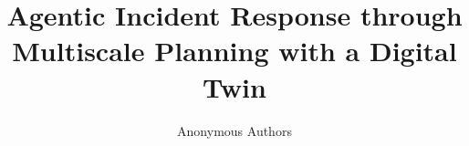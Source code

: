 \documentclass[sigconf]{acmart}
\begin{document}
\title{Agentic Incident Response through \\Multiscale Planning with a Digital Twin}


\author{Anonymous Authors}






\end{document}
